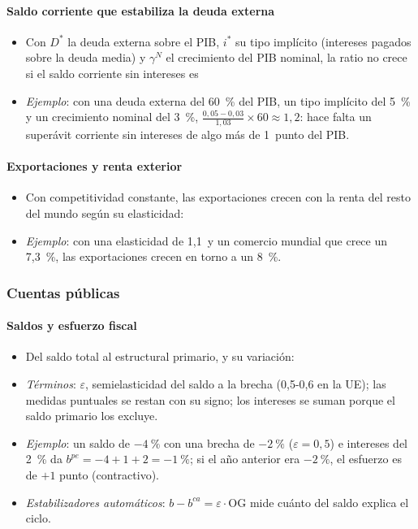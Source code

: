 \documentclass[11pt]{article}
\begin{document}
\paragraph{Saldo corriente que estabiliza la deuda externa}
\begin{itemize}
\item Con $D^*$ la deuda externa sobre el PIB, $i^*$ su tipo implícito (intereses pagados sobre la deuda media) y $\gamma^N$ el crecimiento del PIB nominal, la ratio no crece si el saldo corriente sin intereses es
\item \emph{Ejemplo}: con una deuda externa del 60~\% del PIB, un tipo implícito del 5~\% y un crecimiento nominal del 3~\%, $\frac{0{,}05-0{,}03}{1{,}03}\times60\approx1{,}2$: hace falta un superávit corriente sin intereses de algo más de 1~punto del PIB.
\end{itemize}

\paragraph{Exportaciones y renta exterior}
\begin{itemize}
\item Con competitividad constante, las exportaciones crecen con la renta del resto del mundo según su elasticidad:
\item \emph{Ejemplo}: con una elasticidad de 1,1~y un comercio mundial que crece un 7,3~\%, las exportaciones crecen en torno a un 8~\%.
\end{itemize}

\subsubsection{Cuentas públicas}\label{anexo:calc-fiscal}

\paragraph{Saldos y esfuerzo fiscal}
\begin{itemize}
\item Del saldo total al estructural primario, y su variación:
\item \emph{Términos}: $\varepsilon$, semielasticidad del saldo a la brecha (0,5-0,6 en la UE); las medidas puntuales se restan con su signo; los intereses se suman porque el saldo primario los excluye.
\item \emph{Ejemplo}: un saldo de $-4~\%$ con una brecha de $-2~\%$ ($\varepsilon=0{,}5$) e intereses del 2~\% da $b^{pe}=-4+1+2=-1~\%$; si el año anterior era $-2~\%$, el esfuerzo es de $+1$ punto (contractivo).
\item \emph{Estabilizadores automáticos}: $b-b^{ca}=\varepsilon\cdot\mathrm{OG}$ mide cuánto del saldo explica el ciclo.
\end{itemize}
\end{document}
